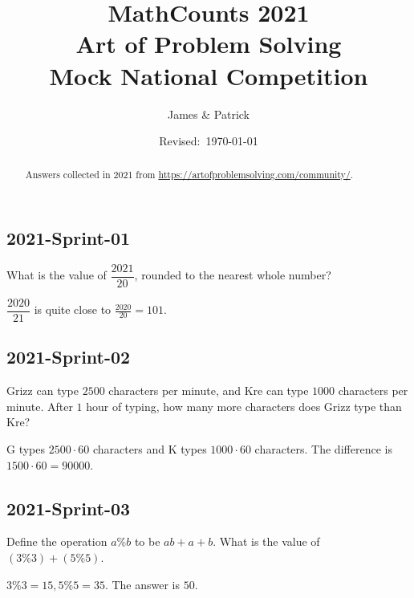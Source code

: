 \documentclass[12pt]{article}
\title{MathCounts 2021 \\ Art of Problem Solving \\ Mock National Competition}
\author{James \& Patrick}
\date{Revised:~\today}
\begin{document}
\maketitle
\begin{abstract}\setlength{\parindent}{0pt}%
Answers collected in 2021 from \url{https://artofproblemsolving.com/community/}. 
\end{abstract}

\thispagestyle{empty}
\clearpage

\subsection*{2021-Sprint-01}
What is the value of $\dfrac{2021}{20}$, rounded to the nearest whole number?
\begin{answer}
$\dfrac{2020}{21}$ is quite close to $\frac{2020}{20}=101$.
\end{answer}

\subsection*{2021-Sprint-02}
Grizz can type $2500$ characters per minute, and Kre can type $1000$ characters per minute. After $1$ hour of typing, how many more characters does Grizz type than Kre?
\begin{answer}
G types $2500\cdot 60$ characters and K types $1000\cdot 60$ characters. The difference is $1500\cdot 60=90000$.
\end{answer}

\subsection*{2021-Sprint-03}
Define the operation $a\%b$ to be $ab + a + b$. What is the value of $(3\%3) + (5\%5)$.
\begin{answer}
$3\%3=15, 5\%5=35$. The answer is $50$.
\end{answer}

\end{document}
